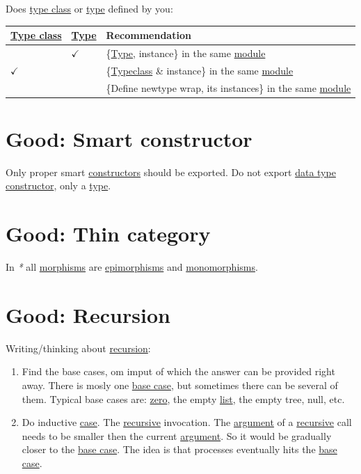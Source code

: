 \documentclass[a4paper,14pt,oneside]{book}
\begin{document}
{Does \hyperref[org6c8048d]{type class} or \hyperref[orga9ca243]{type} defined by you:\\
\begin{center}
\begin{tabular}{lll}
\hyperref[org6c8048d]{Type class} & \hyperref[orga9ca243]{Type} & Recommendation\\
\hline
 & \(\checkmark\) & \{\hyperref[orga9ca243]{Type}, instance\} in the same \hyperref[org240ade3]{module}\\
\(\checkmark\) &  & \{\hyperref[org7e80225]{Typeclass} \& instance\} in the same \hyperref[org240ade3]{module}\\
 &  & \{Define newtype wrap, its instances\} in the same \hyperref[org240ade3]{module}\\
\end{tabular}
\end{center}

\chapter{\label{org3d80206}Good: Smart constructor}
\label{sec:org0d057c2}
Only proper smart \hyperref[org21599a8]{constructors} should be exported. Do not export \hyperref[org3de168a]{data type} \hyperref[org7a94df0]{constructor}, only a \hyperref[orga9ca243]{type}.\\

\chapter{\label{orgdc1216c}Good: Thin category}
\label{sec:org0fc4ab8}
In \emph{*} all \hyperref[org43d1069]{morphisms} are \hyperref[org0a1a765]{epimorphisms} and \hyperref[org50d40f2]{monomorphisms}.\\

\chapter{\label{orgf1e1a47}Good: Recursion}
\label{sec:orgeed1809}
Writing/thinking about \hyperref[orgffd6cda]{recursion}:\\

\begin{enumerate}
\item Find the base cases, om imput of which the answer can be provided right away. There is mosly one \hyperref[org7897c9b]{base case}, but sometimes there can be several of them. Typical base cases are: \hyperref[org9ec9912]{zero}, the empty \hyperref[org47d56c8]{list}, the empty tree, null, etc.\\
\item Do inductive \hyperref[org6609611]{case}. The \hyperref[org692ee3f]{recursive} invocation. The \hyperref[orgdd12744]{argument} of a \hyperref[org692ee3f]{recursive} call needs to be smaller then the current \hyperref[orgdd12744]{argument}. So it would be gradually closer to the \hyperref[org7897c9b]{base case}. The idea is that processes eventually hits the \hyperref[org7897c9b]{base case}.\\
\end{enumerate}

}
\end{document}
